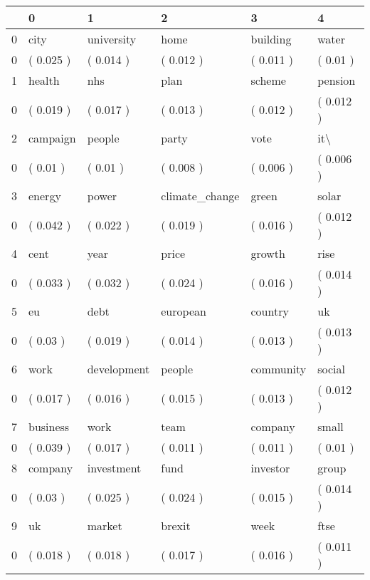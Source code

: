 \begin{tabular}{llllll}
\toprule
{} &          0 &            1 &               2 &          3 &               4 \\
\midrule
0  &       city &   university &            home &   building &           water \\
0  &  ( 0.025 ) &    ( 0.014 ) &       ( 0.012 ) &  ( 0.011 ) &        ( 0.01 ) \\
1  &     health &          nhs &            plan &     scheme &         pension \\
0  &  ( 0.019 ) &    ( 0.017 ) &       ( 0.013 ) &  ( 0.012 ) &       ( 0.012 ) \\
2  &   campaign &       people &           party &       vote &             it\textbackslash  \\
0  &   ( 0.01 ) &     ( 0.01 ) &       ( 0.008 ) &  ( 0.006 ) &       ( 0.006 ) \\
3  &     energy &        power &  climate\_change &      green &           solar \\
0  &  ( 0.042 ) &    ( 0.022 ) &       ( 0.019 ) &  ( 0.016 ) &       ( 0.012 ) \\
4  &       cent &         year &           price &     growth &            rise \\
0  &  ( 0.033 ) &    ( 0.032 ) &       ( 0.024 ) &  ( 0.016 ) &       ( 0.014 ) \\
5  &         eu &         debt &        european &    country &              uk \\
0  &   ( 0.03 ) &    ( 0.019 ) &       ( 0.014 ) &  ( 0.013 ) &       ( 0.013 ) \\
6  &       work &  development &          people &  community &          social \\
0  &  ( 0.017 ) &    ( 0.016 ) &       ( 0.015 ) &  ( 0.013 ) &       ( 0.012 ) \\
7  &   business &         work &            team &    company &           small \\
0  &  ( 0.039 ) &    ( 0.017 ) &       ( 0.011 ) &  ( 0.011 ) &        ( 0.01 ) \\
8  &    company &   investment &            fund &   investor &           group \\
0  &   ( 0.03 ) &    ( 0.025 ) &       ( 0.024 ) &  ( 0.015 ) &       ( 0.014 ) \\
9  &         uk &       market &          brexit &       week &            ftse \\
0  &  ( 0.018 ) &    ( 0.018 ) &       ( 0.017 ) &  ( 0.016 ) &       ( 0.011 ) \\

\end{tabular}
